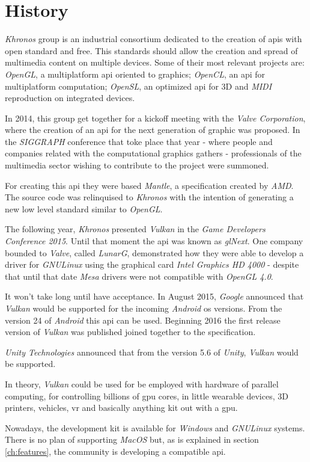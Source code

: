 \chapter{History}
\emph{Khronos} group is an industrial consortium dedicated to the creation of \gls{api}s with open standard and free.
This standards should allow the creation and spread of multimedia content on multiple devices. Some of their most
relevant projects are: \emph{OpenGL}, a multiplatform \gls{api} oriented to graphics; \emph{OpenCL}, an \gls{api} for
multiplatform computation; \emph{OpenSL}, an optimized \gls{api} for 3D and \emph{MIDI} reproduction on integrated
devices.

In 2014, this group get together for a kickoff meeting with the \emph{Valve Corporation}, where the creation of an
\gls{api} for the next generation of graphic was proposed. In the \emph{SIGGRAPH} conference that toke place that
year - where people and companies related with the computational graphics gathers - professionals of the multimedia
sector wishing to contribute to the project were summoned.

For creating this \gls{api} they were based \emph{Mantle}, a specification created by \emph{AMD}. The source code was
relinquised to \emph{Khronos} with the intention of generating a new low level standard similar to \emph{OpenGL}.

The following year, \emph{Khronos} presented \emph{Vulkan} in the \emph{Game Developers Conference 2015}. Until that
moment the \gls{api} was known as \emph{glNext}. One company bounded to \emph{Valve}, called \emph{LunarG},
demonstrated how they were able to develop a driver for \emph{GNU\/Linux} using the graphical card
\emph{Intel Graphics HD 4000} - despite that until that date \emph{Mesa} drivers were not compatible with
\emph{OpenGL 4.0}.

It won't take long until have acceptance. In August 2015, \emph{Google} announced that \emph{Vulkan} would be
supported for the incoming \emph{Android} \gls{os} versions. From the version 24 of \emph{Android} this \gls{api} can
be used. Beginning 2016 the first release version of \emph{Vulkan} was published joined together to the specification.

\emph{Unity Technologies} announced that from the version 5.6 of \emph{Unity}, \emph{Vulkan} would be supported.

In theory, \emph{Vulkan} could be used for be employed with hardware of parallel computing, for controlling billions of
\gls{gpu} cores, in little wearable devices, 3D printers, vehicles, \gls{vr} and basically anything kit out with
a \gls{gpu}.

Nowadays, the development kit is available for \emph{Windows} and \emph{GNU\/Linux} systems. There is no plan of
supporting \emph{MacOS} but, as is explained in section \ref{ch:features}, the community is developing a compatible
\gls{api}.
